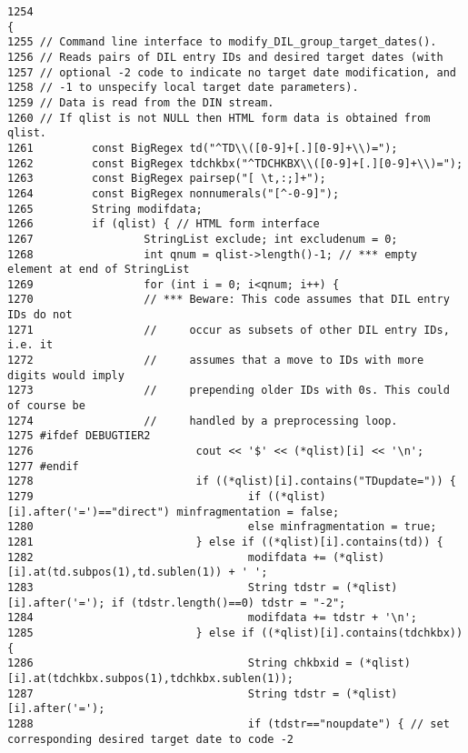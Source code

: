 \footnotesize\begin{verbatim}1254                                                                                          {
1255 // Command line interface to modify_DIL_group_target_dates().
1256 // Reads pairs of DIL entry IDs and desired target dates (with
1257 // optional -2 code to indicate no target date modification, and
1258 // -1 to unspecify local target date parameters).
1259 // Data is read from the DIN stream.
1260 // If qlist is not NULL then HTML form data is obtained from qlist.
1261         const BigRegex td("^TD\\([0-9]+[.][0-9]+\\)=");
1262         const BigRegex tdchkbx("^TDCHKBX\\([0-9]+[.][0-9]+\\)=");
1263         const BigRegex pairsep("[ \t,:;]+");
1264         const BigRegex nonnumerals("[^-0-9]");
1265         String modifdata;
1266         if (qlist) { // HTML form interface
1267                 StringList exclude; int excludenum = 0;
1268                 int qnum = qlist->length()-1; // *** empty element at end of StringList
1269                 for (int i = 0; i<qnum; i++) {
1270                 // *** Beware: This code assumes that DIL entry IDs do not
1271                 //     occur as subsets of other DIL entry IDs, i.e. it
1272                 //     assumes that a move to IDs with more digits would imply
1273                 //     prepending older IDs with 0s. This could of course be
1274                 //     handled by a preprocessing loop.
1275 #ifdef DEBUGTIER2
1276                         cout << '$' << (*qlist)[i] << '\n';
1277 #endif
1278                         if ((*qlist)[i].contains("TDupdate=")) {
1279                                 if ((*qlist)[i].after('=')=="direct") minfragmentation = false;
1280                                 else minfragmentation = true;
1281                         } else if ((*qlist)[i].contains(td)) {
1282                                 modifdata += (*qlist)[i].at(td.subpos(1),td.sublen(1)) + ' ';
1283                                 String tdstr = (*qlist)[i].after('='); if (tdstr.length()==0) tdstr = "-2";
1284                                 modifdata += tdstr + '\n';
1285                         } else if ((*qlist)[i].contains(tdchkbx)) {
1286                                 String chkbxid = (*qlist)[i].at(tdchkbx.subpos(1),tdchkbx.sublen(1));
1287                                 String tdstr = (*qlist)[i].after('=');
1288                                 if (tdstr=="noupdate") { // set corresponding desired target date to code -2

\end{verbatim}
